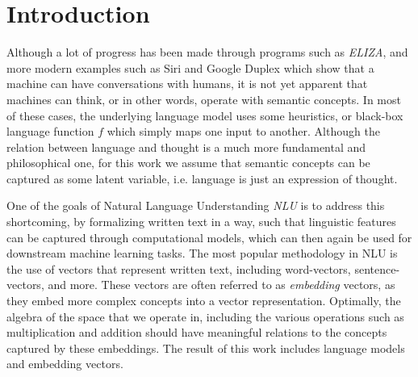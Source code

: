 \documentclass[a4paper,12pt,twoside,openright]{report}
\begin{document}
\pagestyle{fancy}

\fancyhf{}
\fancyhead[L]{\rightmark}
\fancyhead[R]{\thepage}
\renewcommand{\headrulewidth}{0pt}

\singlespacing

\onehalfspacing

\singlespacing


\setcounter{page}{0}
\pagestyle{plain}
\tableofcontents
\listoffigures
\listoftables

\onehalfspacing

\newcommand{\norm}[1]{\left\lVert#1\right\rVert}
\newcommand{\bracket}[1]{\left|#1\right|}
\newcommand{\absdet}[1]{\left|#1\right|}
\newcommand{\bftab}{\fontseries{b}\selectfont}

\newcolumntype{b}{X}

\setcounter{page}{1} 

\newpage
\chapter{Introduction}

Although a lot of progress has been made through programs such as \textit{ELIZA}, and more modern examples such as Siri and Google Duplex which show that a machine can have conversations with humans, it is not yet apparent that machines can think, or in other words, operate with semantic concepts.
In most of these cases, the underlying language model uses some heuristics, or black-box language function $f$ which simply maps one input to another.
Although the relation between language and thought is a much more fundamental and philosophical one, for this work we assume that semantic concepts can be captured as some latent variable, i.e. language is just an expression of thought.
 
One of the goals of Natural Language Understanding \textit{NLU} is to address this shortcoming, by formalizing written text in a way, such that linguistic features can be captured through computational models, which can then again be used for downstream machine learning tasks.
The most popular methodology in NLU is the use of vectors that represent written text, including word-vectors, sentence-vectors, and more. 
These vectors are often referred to as \textit{embedding} vectors, as they embed more complex concepts into a vector representation.
Optimally, the algebra of the space that we operate in, including the various operations such as multiplication and addition should have meaningful relations to the concepts captured by these embeddings.
The result of this work includes language models and embedding vectors.
\\
\end{document}
